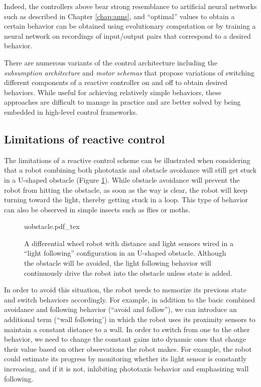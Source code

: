 Indeed, the controllers above bear strong resemblance to artificial neural networks such as described in Chapter \ref{chap:anns}, and ``optimal'' values to obtain a certain behavior can be obtained using evolutionary computation \cite{floreano1998evolutionary} or by training a neural network on recordings of input/output pairs that correspond to a desired behavior. 

There are numerous variants of the control architecture including the \emph{subsumption architecture} \cite{brooks1990elephants} and \emph{motor schemas} \cite{arkin1989motor} that propose variations of switching different components of a reactive controller on and off to obtain desired behaviors. While useful for achieving relatively simple behaviors, these approaches are difficult to manage in practice and are better solved by being embedded in high-level control frameworks.

\subsection{Limitations of reactive control}
The limitations of a reactive control scheme can be illustrated when considering that a robot combining both phototaxis and obstacle avoidance will still get stuck in a U-shaped obstacle (Figure \ref{fig:uobstacle}). While obstacle avoidance will prevent the robot from hitting the obstacle, as soon as the way is clear, the robot will keep turning toward the light, thereby getting stuck in a loop. This type of behavior can also be observed in simple insects such as flies or moths.

\begin{figure}
\centering
    \def\svgwidth{0.72\textwidth}
    {uobstacle.pdf_tex}
    \caption{\label{fig:uobstacle}A differential wheel robot with distance and light sensors wired in a ``light following'' configuration in an U-shaped obstacle. Although the obstacle will be avoided, the light following behavior will continuously drive the robot into the obstacle unless state is added.}
\end{figure}


In order to avoid this situation, the robot needs to memorize its previous state and switch behaviors accordingly. For example, in addition to the basic combined avoidance and following behavior (``avoid and follow''), we can introduce an additional term (``wall following') in which the robot uses its proximity sensors to maintain a constant distance to a wall. In order to switch from one to the other behavior, we need to change the constant gains into dynamic ones that change their value based on other observations the robot makes. For example, the robot could estimate its progress by monitoring whether its light sensor is constantly increasing, and if it is not, inhibiting phototaxis behavior and emphasizing wall following.

